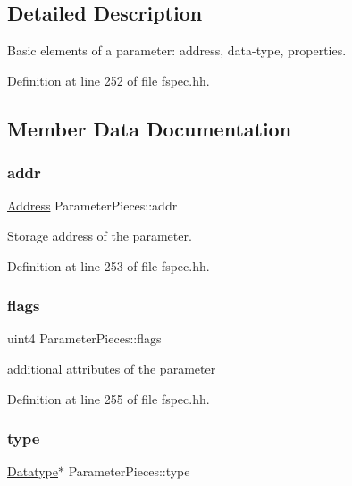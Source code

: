 \subsection{Detailed Description}
Basic elements of a parameter\+: address, data-\/type, properties. 

Definition at line 252 of file fspec.\+hh.



\subsection{Member Data Documentation}
\mbox{\label{struct_parameter_pieces_a64a8ea85886ffa493a625e75cb5b01e0}} 
\subsubsection{\texorpdfstring{addr}{addr}}
{\footnotesize\ttfamily \mbox{\hyperlink{class_address}{Address}} Parameter\+Pieces\+::addr}



Storage address of the parameter. 



Definition at line 253 of file fspec.\+hh.

\mbox{\label{struct_parameter_pieces_aedb19159c26f9137c4ec68238f25933a}} 
\subsubsection{\texorpdfstring{flags}{flags}}
{\footnotesize\ttfamily uint4 Parameter\+Pieces\+::flags}



additional attributes of the parameter 



Definition at line 255 of file fspec.\+hh.

\mbox{\label{struct_parameter_pieces_a628fd8428a2331db63516291840e8409}} 
\subsubsection{\texorpdfstring{type}{type}}
{\footnotesize\ttfamily \mbox{\hyperlink{class_datatype}{Datatype}}$\ast$ Parameter\+Pieces\+::type}




